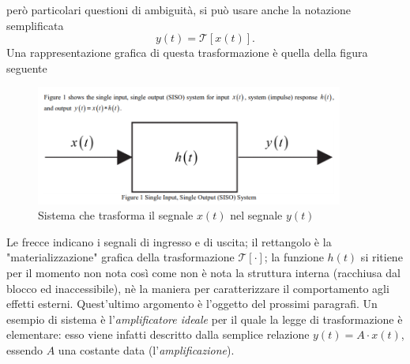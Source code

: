 \documentclass[12pt,oneside,openany]{memoir}
\numberwithin{equation}{subsection}
\begin{document}
per\`o particolari questioni di ambiguit\`a, si pu\`o usare anche la notazione
semplificata
\[
    y(t) = \mathcal{T}[x(t)].
\]
Una rappresentazione grafica di questa trasformazione \`e quella della figura
seguente
\begin{figure}[H]
    \centering
    \captionsetup{justification=centering}
    \includegraphics[width=0.9\textwidth]{images/siso_system.png}
    \caption{Sistema che trasforma il segnale $x(t)$ nel segnale $y(t)$}
\end{figure}
Le frecce indicano i segnali di ingresso e di uscita; il rettangolo \`e la
"materializzazione" grafica della trasformazione $\mathcal{T}[\cdot]$; la
funzione $h(t)$ si ritiene per il momento non nota cos\`i come non \`e nota
la struttura interna (racchiusa dal blocco ed inaccessibile), n\`e la maniera
per caratterizzare il comportamento agli effetti esterni. Quest'ultimo argomento
\`e l'oggetto del prossimi paragrafi.
\bigbreak
Un esempio di sistema \`e l'\textit{amplificatore ideale} per il quale la legge
di trasformazione \`e elementare: esso viene infatti descritto dalla semplice 
relazione $y(t) = A \cdot x(t)$, essendo $A$ una costante data
(l'\textit{amplificazione}).

\end{document}
